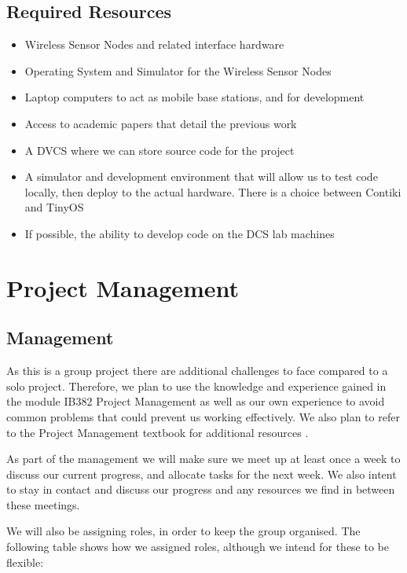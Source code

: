 \documentclass[a4paper]{article}
\begin{document}
\subsection{Required Resources}
\begin{itemize}
	\item Wireless Sensor Nodes and related interface hardware
	\item Operating System and Simulator for the Wireless Sensor Nodes
	\item Laptop computers to act as mobile base stations, and for development
	\item Access to academic papers that detail the previous work
	\item A DVCS where we can store source code for the project
	\item A simulator and development environment that will allow us to test code locally, then deploy to the actual hardware. There is a choice between Contiki \cite{23839452} and TinyOS \cite{levis2003tossim}
	\item If possible, the ability to develop code on the DCS lab machines
\end{itemize}

\section{Project Management}

\subsection{Management}

As this is a group project there are additional challenges to face compared to a solo project. Therefore, we plan to use the knowledge and experience gained in the module IB382 Project Management \cite{IB382} as well as our own experience to avoid common problems that could prevent us working effectively. We also plan to refer to the Project Management textbook for additional resources \cite{PMTextBook}.

As part of the management we will make sure we meet up at least once a week to discuss our current progress, and allocate tasks for the next week. We also intent to stay in contact and discuss our progress and any resources we find in between these meetings.

We will also be assigning roles, in order to keep the group organised. The following table shows how we assigned roles, although we intend for these to be flexible:
\end{document}
